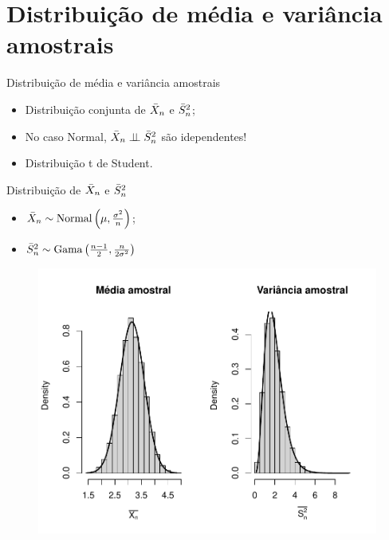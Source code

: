 \section{Distribuição de média e variância amostrais}
\begin{frame}{Distribuição de média e variância amostrais}
 \begin{itemize}
  \item Distribuição conjunta de $\bar{X}_n$ e $\bar{S}^2_n$;
  \item No caso Normal, $\bar{X}_n \perp \!\!\! \perp \bar{S}^2_n$ são idependentes!
  \item Distribuição t de Student.
 \end{itemize}
\end{frame}

\begin{frame}{Distribuição de $\bar{X}_n$ e $\bar{S}^2_n$}
 \begin{itemize}
  \item $\bar{X}_n \sim \operatorname{Normal}\left(\mu, \frac{\sigma^2}{n}\right)$;
  \item $\bar{S}^2_n \sim \operatorname{Gama}\left(\frac{n-1}{2},  \frac{n}{2\sigma^2}\right)$
 \end{itemize}
 \begin{figure}[!ht]
\label{fig:sample_moments_normal}
\begin{center}
\includegraphics[scale=0.5]{figures/sample_moments_normal.pdf} 
\end{center} 
\end{figure} 
\end{frame}

